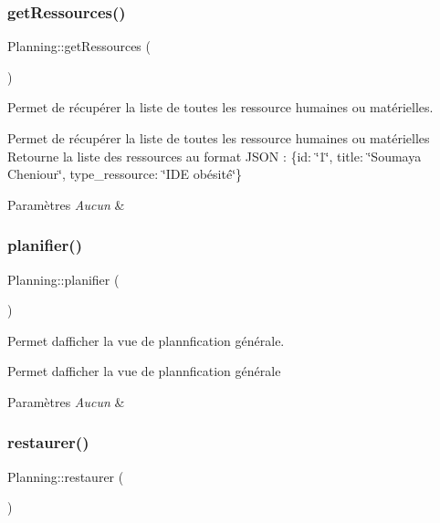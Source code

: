 \subsubsection{\texorpdfstring{get\+Ressources()}{getRessources()}}
{\footnotesize\ttfamily Planning\+::get\+Ressources (\begin{DoxyParamCaption}{ }\end{DoxyParamCaption})}



Permet de récupérer la liste de toutes les ressource humaines ou matérielles. 

Permet de récupérer la liste de toutes les ressource humaines ou matérielles Retourne la liste des ressources au format J\+S\+ON \+: \{id\+: \char`\"{}1\char`\"{}, title\+: \char`\"{}\+Soumaya Cheniour\char`\"{}, type\+\_\+ressource\+: \char`\"{}\+I\+D\+E obésité\char`\"{}\} 
\begin{DoxyParams}{Paramètres}
{\em Aucun} & \\
\hline
\end{DoxyParams}
\mbox{\label{class_planning_a9d08178f98ae683a155391a6dbfbf8ed}} 
\subsubsection{\texorpdfstring{planifier()}{planifier()}}
{\footnotesize\ttfamily Planning\+::planifier (\begin{DoxyParamCaption}{ }\end{DoxyParamCaption})}



Permet d\textquotesingle{}afficher la vue de plannfication générale. 

Permet d\textquotesingle{}afficher la vue de plannfication générale 
\begin{DoxyParams}{Paramètres}
{\em Aucun} & \\
\hline
\end{DoxyParams}
\mbox{\label{class_planning_a419130e49b8ddc19ffa6f8febbcb722d}} 
\subsubsection{\texorpdfstring{restaurer()}{restaurer()}}
{\footnotesize\ttfamily Planning\+::restaurer (\begin{DoxyParamCaption}{ }\end{DoxyParamCaption})}



